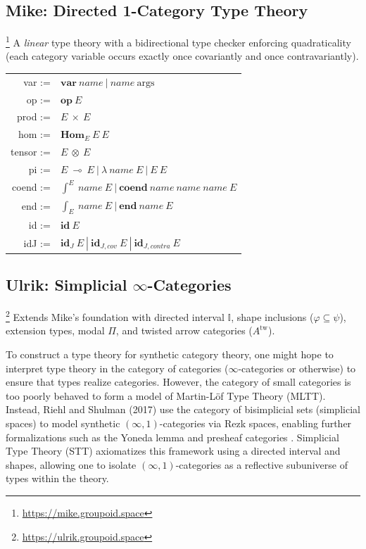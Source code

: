 \documentclass{article}
\theoremstyle{definition}
\theoremstyle{plain}
\begin{document}
\subsection{Mike: Directed 1-Category Type Theory \cite{Shulman15}}\footnote{\url{https://mike.groupoid.space}}
A \emph{linear} type theory with a bidirectional type checker enforcing
quadraticality (each category variable occurs exactly once covariantly and
once contravariantly).
\begin{table}[ht!]
\centering
\begin{tabular}{rl}
     var :=&$\textbf{var}\ name\ |\ name\ \textrm{args}$ \\
      op :=&$\textbf{op}\ E$ \\
    prod :=&$E\ \times\ E$ \\
     hom :=&$\textbf{Hom}_E\ E\ E$ \\
  tensor :=&$E\ \otimes\ E$ \\
      pi :=&$E\ \multimap\ E\ |\ \lambda\ name\ E\ |\ E\ E$ \\
   coend :=&$\int^{E}\ name\ E\ |\ \mathbf{coend}\ name\ name\ name\ E$ \\
     end :=&$\int_{E}\ name\ E\ |\ \mathbf{end}\ name\ E$ \\
      id :=&$\textbf{id}\ E$ \\
     idJ :=&$\textbf{id}_J\ E\ |\ \textbf{id}_{J,cov}\ E\ |\ \textbf{id}_{J,contra}\ E$ \\
\end{tabular}
\end{table}

\newpage
\subsection{Ulrik: Simplicial \texorpdfstring{$\infty$}{Infinity}-Categories \cite{riehl2017type, gratzer2025yoneda}}\footnote{\url{https://ulrik.groupoid.space}}
Extends Mike's foundation with directed interval $\mathbb{I}$, shape
inclusions ($\varphi \subseteq \psi$), extension types, modal $\Pi$, and
twisted arrow categories ($A^{\mathrm{tw}}$).

To construct a type theory for synthetic category theory, one might hope to interpret type theory in the category of categories ($\infty$-categories or otherwise) to ensure that types realize categories. However, the category of small categories is too poorly behaved to form a model of Martin-Löf Type Theory (MLTT). Instead, Riehl and Shulman (2017) \cite{riehl2017type} use the category of bisimplicial sets (simplicial spaces) to model synthetic $(\infty, 1)$-categories via Rezk spaces, enabling further formalizations such as the Yoneda lemma and presheaf categories \cite{gratzer2025yoneda}. Simplicial Type Theory (STT) axiomatizes this framework using a directed interval and shapes, allowing one to isolate $(\infty, 1)$-categories as a reflective subuniverse of types within the theory.
\end{document}
